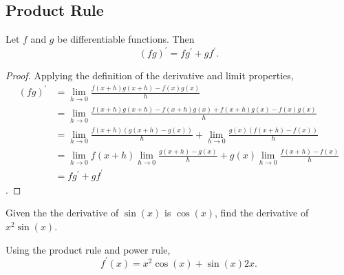 \subsection{Product Rule}
\begin{lemma}
	Let $f$ and $g$ be differentiable functions. Then
	\begin{equation}
		(fg)^\prime = fg^\prime + gf^\prime.
	\end{equation}
\end{lemma}
\begin{proof}
	Applying the definition of the derivative and limit properties,
	\begin{align*}
		(fg)^\prime &= \lim_{h \to 0}{\frac{f(x+h)g(x+h) - f(x)g(x)}{h}} \\
		&= \lim_{h \to 0}{\frac{f(x+h)g(x+h)-f(x+h)g(x)+f(x+h)g(x)-f(x)g(x)}{h}} \\
		&= \lim_{h \to 0}{\frac{f(x+h)\left(g(x+h)-g(x)\right)}{h}} + \lim_{h \to 0}{\frac{g(x)\left(f(x+h)-f(x)\right)}{h}} \\
		&= \lim_{h \to 0}{f(x+h)} \lim_{h \to 0}{\frac{g(x+h)-g(x)}{h}} + g(x)\lim_{h \to 0}{\frac{f(x+h)-f(x)}{h}} \\
		&= fg^\prime + gf^\prime
	\end{align*}.
\end{proof}

\begin{example}
	Given the the derivative of $\sin{(x)}$ is $\cos{(x)}$, find the derivative of $x^2\sin{(x)}$.
\end{example}
\begin{answer}
	Using the product rule and power rule,
	\begin{equation*}
		f^\prime(x) = x^2\cos{(x)} + \sin{(x)}2x.
	\end{equation*}
\end{answer}